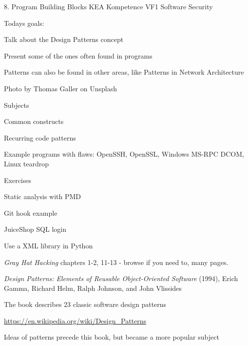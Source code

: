 \documentclass[Screen16to9,17pt]{foils}
\begin{document}
\mytitlepage
{8. Program Building Blocks}
{KEA Kompetence VF1 Software Security}




Todays goals:
\begin{list2}
\item Talk about the Design Patterns concept
\item Present some of the ones often found in programs
\item Patterns can also be found in other areas, like Patterns in Network Architecture
\end{list2}

  Photo by Thomas Galler on Unsplash


\begin{list1}
\item Subjects
\begin{list2}
\item Common constructs
\item Recurring code patterns
\item Example programs with flaws: OpenSSH, OpenSSL, Windows MS-RPC DCOM, Linux teardrop
\end{list2}
\item Exercises
\begin{list2}
\item Static analysis with PMD
\item Git hook example
\item JuiceShop SQL login
\item Use a XML library in Python
\end{list2}
\end{list1}


\begin{list1}
\item \emph{Gray Hat Hacking} chapters 1-2, 11-13 - browse if you need to, many pages.
\end{list1}




\begin{list2}
\item \emph{Design Patterns: Elements of Reusable Object-Oriented Software} (1994), Erich Gamma, Richard Helm, Ralph Johnson, and John Vlissides

\item The book describes 23 classic software design patterns

\item \url{https://en.wikipedia.org/wiki/Design_Patterns}

\item Ideas of patterns precede this book, but became a more popular subject
\end{list2}
\end{document}
